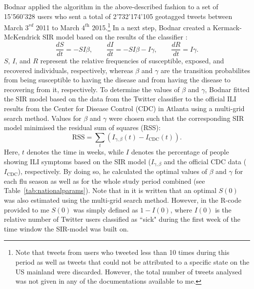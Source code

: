 \documentclass[11pt, a4paper,twoside]{report}\usepackage[]{graphicx}\usepackage[]{color}
\begin{document}
Bodnar applied the algorithm in the above-described fashion to a set of 15'560'328 users who sent a total of 2'732'174'105 geotagged tweets between March $3^\textit{rd}$ 2011 to March $4^\textit{th}$ 2015.\footnote{Note that tweets from users who tweeted less than 10 times during this period as well as tweets that could not be attributed to a specific state on the US mainland were discarded. However, the total number of tweets analysed was not given in any of the documentations available to me.} In a next step, Bodnar created a Kermack-McKendrick SIR model based on the results of the classifier \citep{martcheva2015introduction}:
$$\frac{dS}{dt} = -SI\beta, \qquad \frac{dI}{dt} = -SI\beta - I\gamma, \qquad \frac{dR}{dt} = I\gamma.$$
$S$, $I$, and $R$ represent the relative frequencies of susceptible, exposed, and recovered individuals, respectively, whereas $\beta$ and $\gamma$ are the transition probabilites from being susceptible to having the disease and from having the disease to recovering from it, respectively. To determine the values of $\beta$ and $\gamma$, Bodnar fitted the SIR model based on the data from the Twitter classifier to the official ILI results from the Center for Disease Control (CDC) in Atlanta using a multi-grid search method. Values for $\beta$ and $\gamma$ were chosen such that the corresponding SIR model minimised the residual sum of squares (RSS):
$$\text{RSS} = \sum_{t}(I_{\gamma, \beta}(t)-I_{\text{CDC}}(t)).$$
Here, $t$ denotes the time in weeks, while $I$ denotes the percentage of people showing ILI symptoms based on the SIR model ($I_{\gamma, \beta}$ and the official CDC data ($I_{\text{CDC}}$), respectively. By doing so, he calculated the optimal values of $\beta$ and $\gamma$ for each flu season as well as for the whole study period combined (see Table~\ref{tab:nationalparams}). Note that in \cite{bodnar_data_2015} it is written that an optimal $S(0)$ was also estimated using the multi-grid search method. However, in the R-code provided to me $S(0)$ was simply defined as $1-I(0)$, where $I(0)$ is the relative number of Twitter users classified as ``sick" during the first week of the time window the SIR-model was built on.
\end{document}
